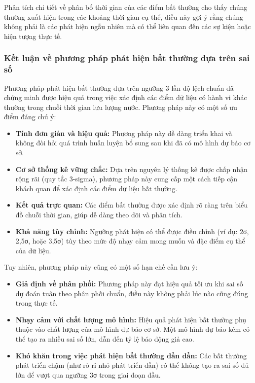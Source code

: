 Phân tích chi tiết về phân bố thời gian của các điểm bất thường cho thấy chúng thường xuất hiện trong các khoảng thời gian cụ thể, điều này gợi ý rằng chúng không phải là các phát hiện ngẫu nhiên mà có thể liên quan đến các sự kiện hoặc hiện tượng thực tế.

\subsubsection{Kết luận về phương pháp phát hiện bất thường dựa trên sai số}

Phương pháp phát hiện bất thường dựa trên ngưỡng 3 lần độ lệch chuẩn đã chứng minh được hiệu quả trong việc xác định các điểm dữ liệu có hành vi khác thường trong chuỗi thời gian lưu lượng nước. Phương pháp này có một số ưu điểm đáng chú ý:

\begin{itemize}
    \item \textbf{Tính đơn giản và hiệu quả:} Phương pháp này dễ dàng triển khai và không đòi hỏi quá trình huấn luyện bổ sung sau khi đã có mô hình dự báo cơ sở.
    
    \item \textbf{Cơ sở thống kê vững chắc:} Dựa trên nguyên lý thống kê được chấp nhận rộng rãi (quy tắc 3-sigma), phương pháp này cung cấp một cách tiếp cận khách quan để xác định các điểm dữ liệu bất thường.
    
    \item \textbf{Kết quả trực quan:} Các điểm bất thường được xác định rõ ràng trên biểu đồ chuỗi thời gian, giúp dễ dàng theo dõi và phân tích.
    
    \item \textbf{Khả năng tùy chỉnh:} Ngưỡng phát hiện có thể được điều chỉnh (ví dụ: 2σ, 2,5σ, hoặc 3,5σ) tùy theo mức độ nhạy cảm mong muốn và đặc điểm cụ thể của dữ liệu.
\end{itemize}

Tuy nhiên, phương pháp này cũng có một số hạn chế cần lưu ý:

\begin{itemize}
    \item \textbf{Giả định về phân phối:} Phương pháp này đạt hiệu quả tối ưu khi sai số dự đoán tuân theo phân phối chuẩn, điều này không phải lúc nào cũng đúng trong thực tế.
    
    \item \textbf{Nhạy cảm với chất lượng mô hình:} Hiệu quả phát hiện bất thường phụ thuộc vào chất lượng của mô hình dự báo cơ sở. Một mô hình dự báo kém có thể tạo ra nhiều sai số lớn, dẫn đến tỷ lệ báo động giả cao.
    
    \item \textbf{Khó khăn trong việc phát hiện bất thường dần dần:} Các bất thường phát triển chậm (như rò rỉ nhỏ phát triển dần) có thể không tạo ra sai số đủ lớn để vượt qua ngưỡng 3σ trong giai đoạn đầu.
\end{itemize}

